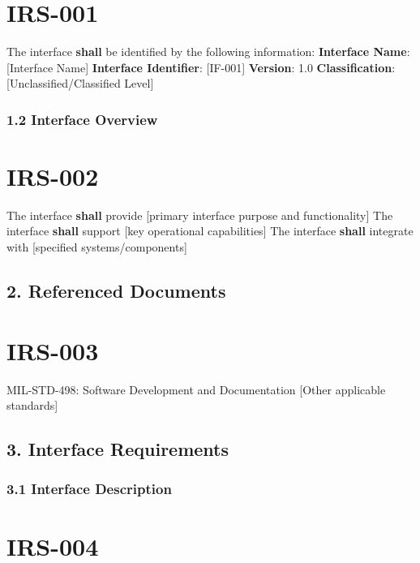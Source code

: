\section{IRS-001}\label{IRS-001}

The interface \textbf{shall} be identified by the following information:
\textbf{Interface Name}: [Interface Name]
\textbf{Interface Identifier}: [IF-001]
\textbf{Version}: 1.0
\textbf{Classification}: [Unclassified/Classified Level]

\subsubsection{1.2 Interface Overview}

\section{IRS-002}\label{IRS-002}

The interface \textbf{shall} provide [primary interface purpose and functionality]
The interface \textbf{shall} support [key operational capabilities]
The interface \textbf{shall} integrate with [specified systems/components]

\subsection{2. Referenced Documents}

\section{IRS-003}\label{IRS-003}

MIL-STD-498: Software Development and Documentation
[Other applicable standards]\\

\subsection{3. Interface Requirements}

\subsubsection{3.1 Interface Description}

\section{IRS-004}\label{IRS-004}

